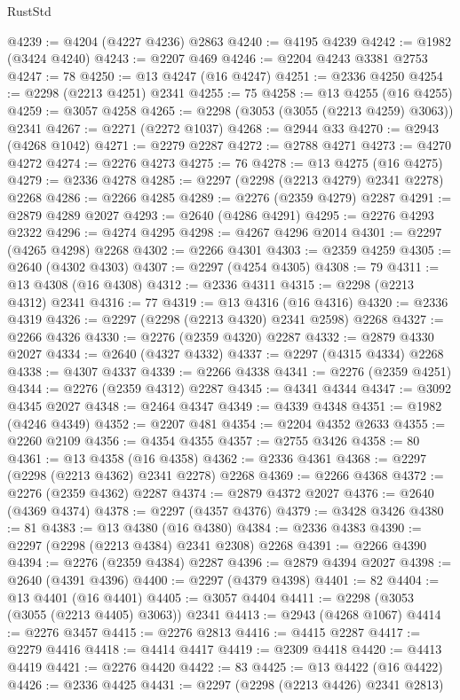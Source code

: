 \begin{lexlean}{RustStd}
\begin{coremodule}
@4239 := @4204 (@4227 @4236) @2863
@4240 := @4195 @4239
@4242 := @1982 (@3424 @4240)
@4243 := @2207 @469
@4246 := @2204 @4243 @3381 @2753
@4247 := 78
@4250 := @13 @4247 (@16 @4247)
@4251 := @2336 @4250
@4254 := @2298 (@2213 @4251) @2341
@4255 := 75
@4258 := @13 @4255 (@16 @4255)
@4259 := @3057 @4258
@4265 := @2298 (@3053 (@3055 (@2213 @4259) @3063)) @2341
@4267 := @2271 (@2272 @1037)
@4268 := @2944 @33
@4270 := @2943 (@4268 @1042)
@4271 := @2279 @2287
@4272 := @2788 @4271
@4273 := @4270 @4272
@4274 := @2276 @4273
@4275 := 76
@4278 := @13 @4275 (@16 @4275)
@4279 := @2336 @4278
@4285 := @2297 (@2298 (@2213 @4279) @2341 @2278) @2268
@4286 := @2266 @4285
@4289 := @2276 (@2359 @4279) @2287
@4291 := @2879 @4289 @2027
@4293 := @2640 (@4286 @4291)
@4295 := @2276 @4293 @2322
@4296 := @4274 @4295
@4298 := @4267 @4296 @2014
@4301 := @2297 (@4265 @4298) @2268
@4302 := @2266 @4301
@4303 := @2359 @4259
@4305 := @2640 (@4302 @4303)
@4307 := @2297 (@4254 @4305)
@4308 := 79
@4311 := @13 @4308 (@16 @4308)
@4312 := @2336 @4311
@4315 := @2298 (@2213 @4312) @2341
@4316 := 77
@4319 := @13 @4316 (@16 @4316)
@4320 := @2336 @4319
@4326 := @2297 (@2298 (@2213 @4320) @2341 @2598) @2268
@4327 := @2266 @4326
@4330 := @2276 (@2359 @4320) @2287
@4332 := @2879 @4330 @2027
@4334 := @2640 (@4327 @4332)
@4337 := @2297 (@4315 @4334) @2268
@4338 := @4307 @4337
@4339 := @2266 @4338
@4341 := @2276 (@2359 @4251)
@4344 := @2276 (@2359 @4312) @2287
@4345 := @4341 @4344
@4347 := @3092 @4345 @2027
@4348 := @2464 @4347
@4349 := @4339 @4348
@4351 := @1982 (@4246 @4349)
@4352 := @2207 @481
@4354 := @2204 @4352 @2633
@4355 := @2260 @2109
@4356 := @4354 @4355
@4357 := @2755 @3426
@4358 := 80
@4361 := @13 @4358 (@16 @4358)
@4362 := @2336 @4361
@4368 := @2297 (@2298 (@2213 @4362) @2341 @2278) @2268
@4369 := @2266 @4368
@4372 := @2276 (@2359 @4362) @2287
@4374 := @2879 @4372 @2027
@4376 := @2640 (@4369 @4374)
@4378 := @2297 (@4357 @4376)
@4379 := @3428 @3426
@4380 := 81
@4383 := @13 @4380 (@16 @4380)
@4384 := @2336 @4383
@4390 := @2297 (@2298 (@2213 @4384) @2341 @2308) @2268
@4391 := @2266 @4390
@4394 := @2276 (@2359 @4384) @2287
@4396 := @2879 @4394 @2027
@4398 := @2640 (@4391 @4396)
@4400 := @2297 (@4379 @4398)
@4401 := 82
@4404 := @13 @4401 (@16 @4401)
@4405 := @3057 @4404
@4411 := @2298 (@3053 (@3055 (@2213 @4405) @3063)) @2341
@4413 := @2943 (@4268 @1067)
@4414 := @2276 @3457
@4415 := @2276 @2813
@4416 := @4415 @2287
@4417 := @2279 @4416
@4418 := @4414 @4417
@4419 := @2309 @4418
@4420 := @4413 @4419
@4421 := @2276 @4420
@4422 := 83
@4425 := @13 @4422 (@16 @4422)
@4426 := @2336 @4425
@4431 := @2297 (@2298 (@2213 @4426) @2341 @2813)

\end{coremodule}
\end{lexlean}
